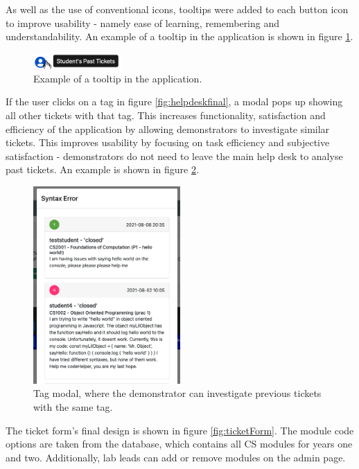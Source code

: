 As well as the use of conventional icons, tooltips were added to each button icon to improve usability - namely ease of learning, remembering and understandability. An example of a tooltip in the application is shown in figure \ref{fig:tooltip}. 

\begin{figure}[H]
    \centering
    \includegraphics[width=0.3\textwidth]{7design/images/tooltip.png}
    \caption{Example of a tooltip in the application.}
    \label{fig:tooltip}
\end{figure}

If the user clicks on a tag in figure \ref{fig:helpdeskfinal}, a modal pops up showing all other tickets with that tag. This increases functionality, satisfaction and efficiency of the application by allowing demonstrators to investigate similar tickets. This improves usability by focusing on task efficiency and subjective satisfaction - demonstrators do not need to leave the main help desk to analyse past tickets. An example is shown in figure \ref{fig:tagModal}.

\begin{figure}[H]
    \centering
    \includegraphics[width=0.5\textwidth]{7design/images/tagModal.png}
    \caption{Tag modal, where the demonstrator can investigate previous tickets with the same tag.}
    \label{fig:tagModal}
\end{figure}

The ticket form's final design is shown in figure \ref{fig:ticketForm}. The module code options are taken from the database, which contains all CS modules for years one and two. Additionally, lab leads can add or remove modules on the admin page.

